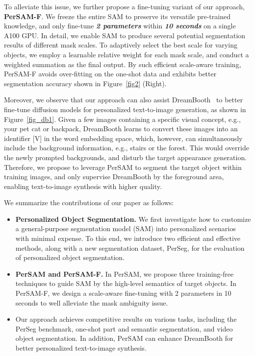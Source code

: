 \documentclass{article} \usepackage{iclr2024_conference,times}
\begin{document}
To alleviate this issue, we further propose a fine-tuning variant of our approach, \textbf{PerSAM-F}. We freeze the entire SAM to preserve its versatile pre-trained knowledge, and only fine-tune \textbf{\textit{2 parameters}} within \textbf{\textit{10 seconds}} on a single A100 GPU. In detail, we enable SAM to produce several potential segmentation results of different mask scales. To adaptively select the best scale for varying objects, we employ a learnable relative weight for each mask scale, and conduct a weighted summation as the final output.
By such efficient scale-aware training, PerSAM-F avoids over-fitting on the one-shot data and exhibits better segmentation accuracy shown in Figure~\ref{fig2} (Right).


Moreover, we observe that our approach can also assist DreamBooth~\citep{ruiz2022dreambooth} to better fine-tune diffusion models for personalized text-to-image generation, as shown in Figure~\ref{fig_db1}. Given a few images containing a specific visual concept, e.g., your pet cat or backpack, DreamBooth learns to convert these images into an identifier [V] in the word embedding space, which, however, can simultaneously include the background information, e.g., stairs or the forest. This would override the newly prompted backgrounds, and disturb the target appearance generation. Therefore, we propose to leverage PerSAM to segment the target object within training images, and only supervise DreamBooth by the foreground area, enabling text-to-image synthesis with higher quality.

We summarize the contributions of our paper as follows:

\begin{itemize}
   \item \textbf{Personalized Object Segmentation.}
   We first investigate how to customize a general-purpose segmentation model (SAM) into personalized scenarios with minimal expense. To this end, we introduce two efficient and effective methods, along with a new segmentation dataset, PerSeg, for the evaluation of personalized object segmentation.
   
   \item \textbf{PerSAM and PerSAM-F.}
   In PerSAM, we propose three training-free techniques to guide SAM by the high-level semantics of target objects. In PerSAM-F, we design a scale-aware fine-tuning with 2 parameters in 10 seconds to well alleviate the mask ambiguity issue.

    \item 
    Our approach achieves competitive results on various tasks, including the PerSeg benchmark, one-shot part and semantic segmentation, and video object segmentation. In addition, PerSAM can enhance DreamBooth for better personalized text-to-image synthesis.
\end{itemize}
\end{document}
